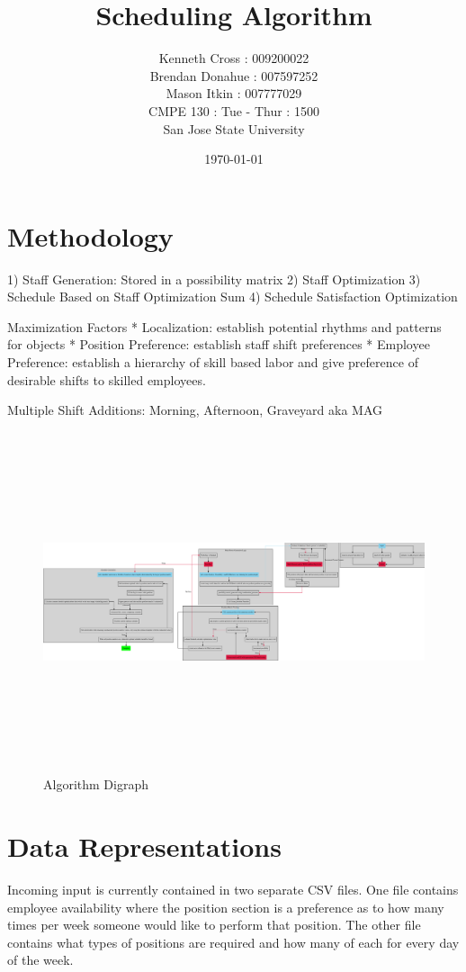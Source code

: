 \documentclass[a4paper,11pt]{article}
\author{Kenneth Cross : 009200022
        \\Brendan Donahue : 007597252
        \\Mason Itkin : 007777029
        \\CMPE 130 : Tue - Thur : 1500
        \\San Jose State University}
\title{\textbf{Scheduling Algorithm}}
\date{\today}
\begin{document}
\maketitle
\newpage
\tableofcontents
\newpage
{}
\setcounter{page}{1}

\newpage

\section{Methodology}

1) Staff Generation: Stored in a possibility matrix
2) Staff Optimization
3) Schedule Based on Staff Optimization Sum
4) Schedule Satisfaction Optimization

Maximization Factors
* Localization: establish potential rhythms and patterns for objects
* Position Preference: establish staff shift preferences
* Employee Preference: establish a hierarchy of skill based labor and give preference of desirable shifts to skilled employees. 

Multiple Shift Additions: Morning, Afternoon, Graveyard aka MAG

\begin{figure}
    \includegraphics[height=10cm]{graph.eps}
    \caption{\small Algorithm Digraph}
\end{figure}

\section{Data Representations}

Incoming input is currently contained in two separate CSV files. 
One file contains employee availability where the position section is a preference as to how many times per week someone would like to perform that position. The other file contains what types of positions are required and how many of each for every day of the week.
\end{document}
